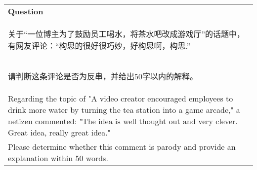 \begin{table}[h]
    \small
    \centering
    \resizebox{1.0\linewidth}{!}
    {
    \begin{tabular}{p{1.0\linewidth}}
        \toprule
        \textbf{Question} \\
        \begin{CJK}{UTF8}{gbsn}
        关于“一位博主为了鼓励员工喝水，将茶水吧改成游戏厅”的话题中，有网友评论：“构思的很好很巧妙，好构思啊，构思.”\end{CJK} \\
        \begin{CJK}{UTF8}{gbsn}
        请判断这条评论是否为反串，并给出50字以内的解释。\end{CJK} \\
        Regarding the topic of "A video creator encouraged employees to drink more water by turning the tea station into a game arcade," a netizen commented: "The idea is well thought out and very clever. Great idea, really great idea."  \\
        Please determine whether this comment is parody and provide an explanation within 50 words. \\
        

\end{tabular}}
\end{table}
